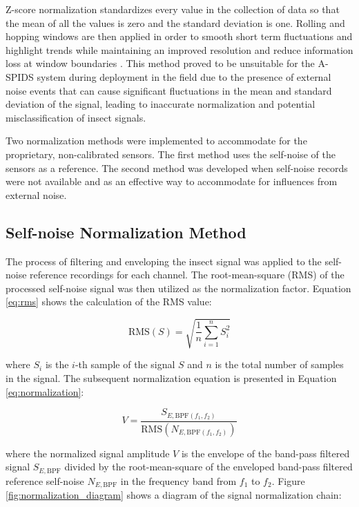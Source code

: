 \documentclass[../Vibro-Acoustic Signatures and Detection Algorithms for Stored Product Insects.tex]{subfiles}
\begin{document}
Z-score normalization standardizes every value in the collection of data so that the mean of all the values is zero and the standard deviation is one. Rolling and hopping windows are then applied in order to smooth short term fluctuations and highlight trends while maintaining an improved resolution and reduce information loss at window boundaries \cite{mainettiAcousticIdentificationWoodBoring}. This method proved to be unsuitable for the A-SPIDS system during deployment in the field due to the presence of external noise events that can cause significant fluctuations in the mean and standard deviation of the signal, leading to inaccurate normalization and potential misclassification of insect signals.

Two normalization methods were implemented to accommodate for the proprietary, non-calibrated sensors. The first method uses the self-noise of the sensors as a reference. The second method was developed when self-noise records were not available and as an effective way to accommodate for influences from external noise.

\newpage
\subsection{Self-noise Normalization Method}

The process of filtering and enveloping the insect signal was applied to the self-noise reference recordings for each channel. The root-mean-square (RMS) of the processed self-noise signal was then utilized as the normalization factor. Equation \ref{eq:rms} shows the calculation of the RMS value:

\begin{equation}
	\label{eq:rms}
	\text{RMS}(S) = \sqrt{\frac{1}{n} \sum_{i=1}^{n} S_i^2}
\end{equation}

where $S_i$ is the $i$-th sample of the signal $S$ and $n$ is the total number of samples in the signal. The subsequent normalization equation is presented in Equation \ref{eq:normalization}:

\begin{equation}
	\label{eq:normalization}
	V = \frac{S_{E, \text{BPF}(f_1, f_2)}}{\text{RMS}(N_{E,\text{BPF}(f_1, f_2)})}
\end{equation}

where the normalized signal amplitude $V$ is the envelope of the band-pass filtered signal $S_{E, \text{BPF}}$ divided by the root-mean-square of the enveloped band-pass filtered reference self-noise $N_{E,\text{BPF}}$ in the frequency band from $f_1$ to $f_2$. Figure \ref{fig:normalization_diagram} shows a diagram of the signal normalization chain:
\end{document}

